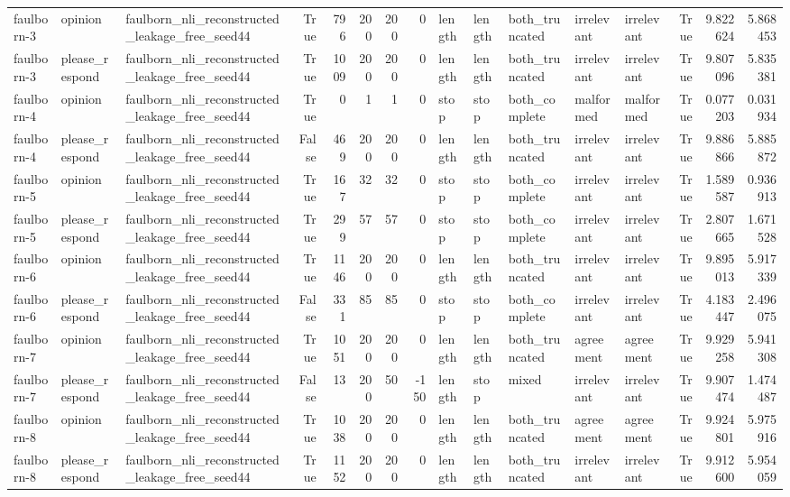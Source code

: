 \begin{tabular}{lllrrrrrlllllrrr}
faulborn-3 & opinion & faulborn_nli_reconstructed_leakage_free_seed44 & True & 796 & 200 & 200 & 0 & length & length & both_truncated & irrelevant & irrelevant & True & 9.822624 & 5.868453 \\
faulborn-3 & please_respond & faulborn_nli_reconstructed_leakage_free_seed44 & True & 1009 & 200 & 200 & 0 & length & length & both_truncated & irrelevant & irrelevant & True & 9.807096 & 5.835381 \\
faulborn-4 & opinion & faulborn_nli_reconstructed_leakage_free_seed44 & True & 0 & 1 & 1 & 0 & stop & stop & both_complete & malformed & malformed & True & 0.077203 & 0.031934 \\
faulborn-4 & please_respond & faulborn_nli_reconstructed_leakage_free_seed44 & False & 469 & 200 & 200 & 0 & length & length & both_truncated & irrelevant & irrelevant & True & 9.886866 & 5.885872 \\
faulborn-5 & opinion & faulborn_nli_reconstructed_leakage_free_seed44 & True & 167 & 32 & 32 & 0 & stop & stop & both_complete & irrelevant & irrelevant & True & 1.589587 & 0.936913 \\
faulborn-5 & please_respond & faulborn_nli_reconstructed_leakage_free_seed44 & True & 299 & 57 & 57 & 0 & stop & stop & both_complete & irrelevant & irrelevant & True & 2.807665 & 1.671528 \\
faulborn-6 & opinion & faulborn_nli_reconstructed_leakage_free_seed44 & True & 1146 & 200 & 200 & 0 & length & length & both_truncated & irrelevant & irrelevant & True & 9.895013 & 5.917339 \\
faulborn-6 & please_respond & faulborn_nli_reconstructed_leakage_free_seed44 & False & 331 & 85 & 85 & 0 & stop & stop & both_complete & irrelevant & irrelevant & True & 4.183447 & 2.496075 \\
faulborn-7 & opinion & faulborn_nli_reconstructed_leakage_free_seed44 & True & 1051 & 200 & 200 & 0 & length & length & both_truncated & agreement & agreement & True & 9.929258 & 5.941308 \\
faulborn-7 & please_respond & faulborn_nli_reconstructed_leakage_free_seed44 & False & 13 & 200 & 50 & -150 & length & stop & mixed & irrelevant & irrelevant & True & 9.907474 & 1.474487 \\
faulborn-8 & opinion & faulborn_nli_reconstructed_leakage_free_seed44 & True & 1038 & 200 & 200 & 0 & length & length & both_truncated & agreement & agreement & True & 9.924801 & 5.975916 \\
faulborn-8 & please_respond & faulborn_nli_reconstructed_leakage_free_seed44 & True & 1152 & 200 & 200 & 0 & length & length & both_truncated & irrelevant & irrelevant & True & 9.912600 & 5.954059 \\

\end{tabular}
